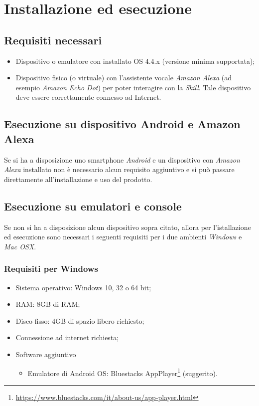 \clearpage
\section{Installazione ed esecuzione}
\label{sec:installazione}
\subsection{Requisiti necessari}
\label{sec:requisiti_software}
\begin{itemize}
	\item Dispositivo o emulatore con installato  OS 4.4.x (versione minima supportata);
	\item Dispositivo fisico (o virtuale) con l'assistente vocale \textit{Amazon Alexa} (ad esempio \textit{Amazon Echo Dot}) per poter interagire con la \textit{Skill}.
	Tale dispositivo deve essere correttamente connesso ad Internet.
\end{itemize}
\subsection{Esecuzione su dispositivo Android e Amazon Alexa}
Se si ha a disposizione uno smartphone \textit{Android} e un dispositivo con \textit{Amazon Alexa} installato non è necessario alcun requisito aggiuntivo e si può passare direttamente all'installazione e uso del prodotto.  
\subsection{Esecuzione su emulatori e console}
Se non si ha a disposizione alcun dispositivo sopra citato, allora per l'istallazione ed esecuzione sono necessari i seguenti requisiti per i due ambienti \textit{Windows} e \textit{Mac OSX}.
\subsubsection{Requisiti per Windows}
\label{sec:requisiti_win}
\begin{itemize}
	\item Sistema operativo: Windows 10, 32 o 64 bit;
	\item RAM: 8GB di RAM;
	\item Disco fisso: 4GB di spazio libero richiesto;
	\item Connessione ad internet richiesta;
	\item Software aggiuntivo
	\begin{itemize}
		\item Emulatore di Android OS: Bluestacks AppPlayer\footnote{\href{https://www.bluestacks.com/it/about-us/app-player.html}{https://www.bluestacks.com/it/about-us/app-player.html}} (suggerito).
	\end{itemize}
\end{itemize}
